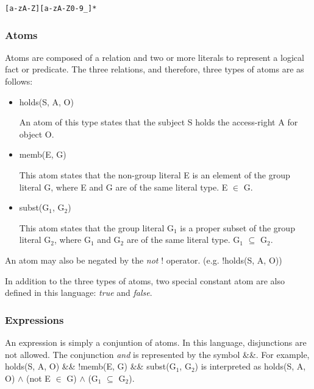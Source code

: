 \documentclass[a4paper]{article}
\begin{document}
\begin{verbatim}
[a-zA-Z][a-zA-Z0-9_]*
\end{verbatim}

      \subsubsection{Atoms}

        Atoms are composed of a relation and two or more literals to represent
        a logical fact or predicate. The three relations, and therefore, three
        types of atoms are as follows:

        \begin{itemize}

          \item holds(S, A, O)

            An atom of this type states that the subject S holds the
            access-right A for object O.

          \item memb(E, G)

          This atom states that the non-group literal E is an element of the
          group literal G, where E and G are of the same literal type.
          E $\in$ G.

          \item subst(G$_{1}$, G$_{2}$)

          This atom states that the group literal G$_{1}$ is a proper
          subset of the group literal G$_{2}$, where G$_{1}$ and G$_{2}$
          are of the same literal type. G$_{1}$ $\subseteq$ G$_{2}$.

        \end{itemize}

        An atom may also be negated by the \emph{not} ! operator. (e.g.
        !holds(S, A, O))

        In addition to the three types of atoms, two special constant atom are
        also defined in this language: \emph{true} and \emph{false}.

      \subsubsection{Expressions}

        An expression is simply a conjuntion of atoms. In this language,
        disjunctions are not allowed. The conjunction \emph{and} is 
        represented by the symbol \&\&. For example, holds(S, A, O) \&\& 
        !memb(E, G) \&\& subst(G$_{1}$, G$_{2}$) is interpreted as
        holds(S, A, O) $\land$ (not E $\in$ G) $\land$ (G$_{1}$
        $\subseteq$ G$_{2}$).
\end{document}
